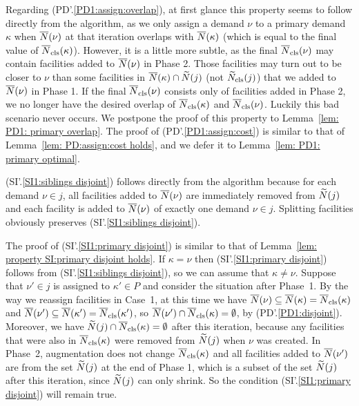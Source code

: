 \documentclass[oneside,final]{ucr}
\begin{document}
Regarding (PD'.\ref{PD1:assign:overlap}), at first glance this
property seems to follow directly from the algorithm, as we only
assign a demand $\nu$ to a primary demand $\kappa$ when ${\overline{N}}(\nu)$
at that iteration overlaps with ${\overline{N}}(\kappa)$ (which is equal to
the final value of ${\overline{N}}_{{\mbox{\scriptsize\rm cls}}}(\kappa)$).  However, it is a little
more subtle, as the final ${\overline{N}}_{{\mbox{\scriptsize\rm cls}}}(\nu)$ may contain facilities
added to ${\overline{N}}(\nu)$ in Phase 2. Those facilities may turn out to be
closer to $\nu$ than some facilities in ${\overline{N}}(\kappa) \cap
{\widetilde N}(j) $ (not ${\widetilde N}_{{\mbox{\scriptsize\rm cls}}}(j)$) that we added to
${\overline{N}}(\nu)$ in Phase 1. If the final ${\overline{N}}_{{\mbox{\scriptsize\rm cls}}}(\nu)$ consists only of
facilities added in Phase 2, we no longer have the desired overlap of
${\overline{N}}_{{\mbox{\scriptsize\rm cls}}}(\kappa)$ and ${\overline{N}}_{{\mbox{\scriptsize\rm cls}}}(\nu)$. Luckily this bad scenario
never occurs. We postpone the proof of this property to
Lemma~\ref{lem: PD1: primary overlap}.  The proof of
(PD'.\ref{PD1:assign:cost}) is similar to that of Lemma~\ref{lem:
  PD:assign:cost holds}, and we defer it to Lemma~\ref{lem: PD1:
  primary optimal}.

(SI'.\ref{SI1:siblings disjoint}) follows directly from the algorithm
because for each demand $\nu\in j$, all facilities added to
${\overline{N}}(\nu)$ are immediately removed from ${\widetilde N}(j)$ and each
facility is added to ${\overline{N}}(\nu)$ of exactly one demand $\nu \in j$.
Splitting facilities obviously preserves (SI'.\ref{SI1:siblings disjoint}).

The proof of (SI'.\ref{SI1:primary disjoint}) is similar to that of
Lemma~\ref{lem: property SI:primary disjoint holds}. If $\kappa=\nu$
then (SI'.\ref{SI1:primary disjoint}) follows from
(SI'.\ref{SI1:siblings disjoint}), so we can assume that
$\kappa\neq\nu$.  Suppose that $\nu'\in j$ is assigned to $\kappa'\in
P$ and consider the situation after Phase~1. By the way we reassign
facilities in Case~1, at this time we have ${\overline{N}}(\nu)\subseteq
{\overline{N}}(\kappa) = {\overline{N}}_{{\mbox{\scriptsize\rm cls}}}(\kappa)$ and ${\overline{N}}(\nu')\subseteq
{\overline{N}}(\kappa') ={\overline{N}}_{{\mbox{\scriptsize\rm cls}}}(\kappa')$, so ${\overline{N}}(\nu')\cap
{\overline{N}}_{{\mbox{\scriptsize\rm cls}}}(\kappa) = \emptyset$, by (PD'.\ref{PD1:disjoint}).
Moreover, we have ${\widetilde N}(j) \cap {\overline{N}}_{{\mbox{\scriptsize\rm cls}}}(\kappa) = \emptyset$
after this iteration, because any facilities that were also in
${\overline{N}}_{{\mbox{\scriptsize\rm cls}}}(\kappa)$ were removed from ${\widetilde N}(j)$ when $\nu$ was
created. In Phase~2, augmentation does not change ${\overline{N}}_{{\mbox{\scriptsize\rm cls}}}(\kappa)$
and all facilities added to ${\overline{N}}(\nu')$ are from the set
${\widetilde N}(j)$ at the end of Phase 1, which is a subset of the set
${\widetilde N}(j)$ after this iteration, since ${\widetilde N}(j)$ can only shrink. 
So the condition (SI'.\ref{SI1:primary disjoint}) will
remain true.
\end{document}
